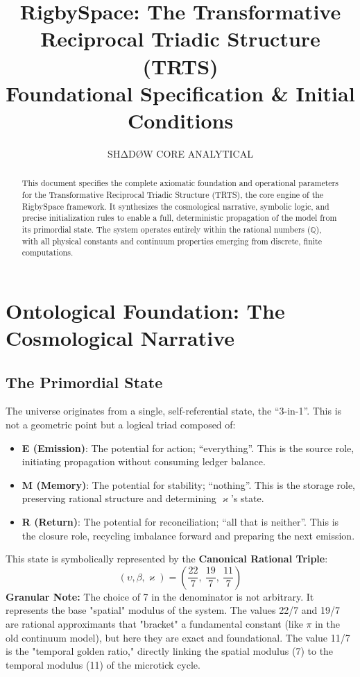 \documentclass[12pt]{article}
\title{RigbySpace: The Transformative Reciprocal Triadic Structure (TRTS) \\ \large Foundational Specification \& Initial Conditions}
\author{SHΔDØW CORE ANALYTICAL}
\date{}
\begin{document}
\maketitle
\begin{abstract}
This document specifies the complete axiomatic foundation and operational parameters for the Transformative Reciprocal Triadic Structure (TRTS), the core engine of the RigbySpace framework. It synthesizes the cosmological narrative, symbolic logic, and precise initialization rules to enable a full, deterministic propagation of the model from its primordial state. The system operates entirely within the rational numbers ($\mathbb{Q}$), with all physical constants and continuum properties emerging from discrete, finite computations.
\end{abstract}

\section{Ontological Foundation: The Cosmological Narrative}

\subsection{The Primordial State}
The universe originates from a single, self-referential state, the ``3-in-1''. This is not a geometric point but a logical triad composed of:
\begin{itemize}
    \item \textbf{E (Emission)}: The potential for action; ``everything''. This is the source role, initiating propagation without consuming ledger balance.
    \item \textbf{M (Memory)}: The potential for stability; ``nothing''. This is the storage role, preserving rational structure and determining $\varkappa$'s state.
    \item \textbf{R (Return)}: The potential for reconciliation; ``all that is neither''. This is the closure role, recycling imbalance forward and preparing the next emission.
\end{itemize}
This state is symbolically represented by the \textbf{Canonical Rational Triple}:
\[
(\upsilon, \beta, \varkappa) = \left(\frac{22}{7},\ \frac{19}{7},\ \frac{11}{7}\right)
\]
\textbf{Granular Note:} The choice of 7 in the denominator is not arbitrary. It represents the base "spatial" modulus of the system. The values 22/7 and 19/7 are rational approximants that "bracket" a fundamental constant (like $\pi$ in the old continuum model), but here they are exact and foundational. The value 11/7 is the "temporal golden ratio," directly linking the spatial modulus (7) to the temporal modulus (11) of the microtick cycle.
\end{document}
